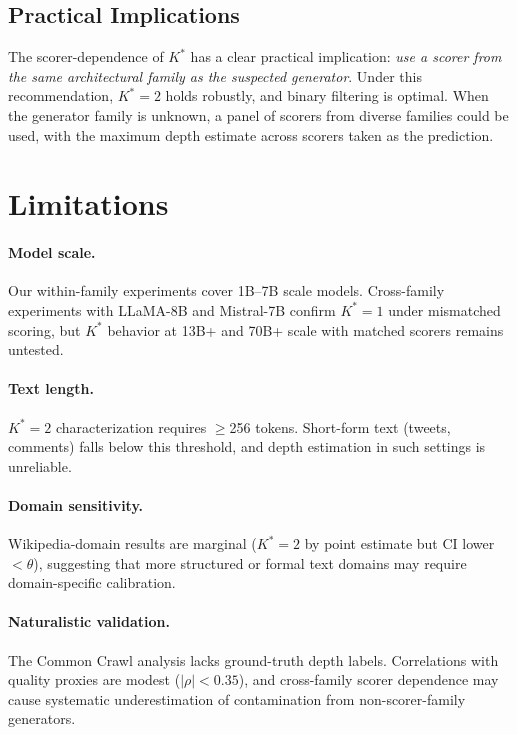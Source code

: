 \documentclass[11pt,a4paper]{article}
\newcommand{\kstar}{K^{*}}
\begin{document}
\subsection{Practical Implications}

The scorer-dependence of $\kstar$ has a clear practical implication: \emph{use a scorer from the same architectural family as the suspected generator}.
Under this recommendation, $\kstar = 2$ holds robustly, and binary filtering is optimal.
When the generator family is unknown, a panel of scorers from diverse families could be used, with the maximum depth estimate across scorers taken as the prediction.

\section{Limitations}
\label{sec:limitations}

\paragraph{Model scale.}
Our within-family experiments cover 1B--7B scale models.
Cross-family experiments with LLaMA-8B and Mistral-7B confirm $\kstar = 1$ under mismatched scoring, but $\kstar$ behavior at 13B+ and 70B+ scale with matched scorers remains untested.

\paragraph{Text length.}
$\kstar = 2$ characterization requires $\geq$256 tokens.
Short-form text (tweets, comments) falls below this threshold, and depth estimation in such settings is unreliable.

\paragraph{Domain sensitivity.}
Wikipedia-domain results are marginal ($\kstar = 2$ by point estimate but CI lower $< \theta$), suggesting that more structured or formal text domains may require domain-specific calibration.

\paragraph{Naturalistic validation.}
The Common Crawl analysis lacks ground-truth depth labels.
Correlations with quality proxies are modest ($|\rho| < 0.35$), and cross-family scorer dependence may cause systematic underestimation of contamination from non-scorer-family generators.
\end{document}

